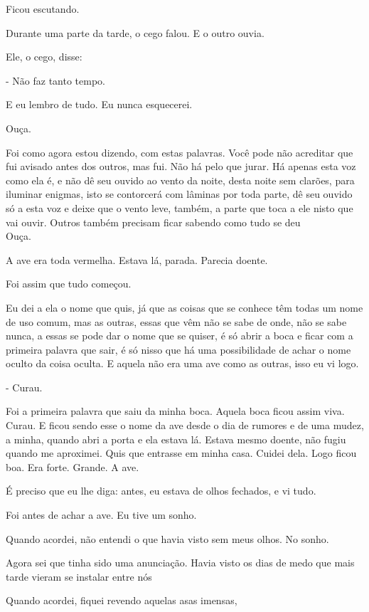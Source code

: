 Ficou escutando.

Durante uma parte da tarde, o cego falou. E o outro ouvia.

Ele, o cego, disse:

- Não faz tanto tempo.

E eu lembro de tudo. Eu nunca esquecerei.

Ouça.

Foi como agora estou dizendo, com estas palavras. Você pode não
acreditar que fui avisado antes dos outros, mas fui. Não há pelo que
jurar. Há apenas esta voz como ela é, e não dê seu ouvido ao vento da
noite, desta noite sem clarões, para iluminar enigmas, isto se
contorcerá com lâminas por toda parte, dê seu ouvido só a esta voz e
deixe que o vento leve, também, a parte que toca a ele nisto que vai
ouvir. Outros também precisam ficar sabendo como tudo se deu\\

Ouça.

A ave era toda vermelha. Estava lá, parada. Parecia doente.

Foi assim que tudo começou.

Eu dei a ela o nome que quis, já que as coisas que se conhece têm todas
um nome de uso comum, mas as outras, essas que vêm não se sabe de onde,
não se sabe nunca, a essas se pode dar o nome que se quiser, é só abrir
a boca e ficar com a primeira palavra que sair, é só nisso que há uma
possibilidade de achar o nome oculto da coisa oculta. E aquela não era
uma ave como as outras, isso eu vi logo.

- Curau.

Foi a primeira palavra que saiu da minha boca. Aquela boca ficou assim
viva. Curau. E ficou sendo esse o nome da ave desde o dia de rumores e
de uma mudez, a minha, quando abri a porta e ela estava lá. Estava mesmo
doente, não fugiu quando me aproximei. Quis que entrasse em minha casa.
Cuidei dela. Logo ficou boa. Era forte. Grande. A ave.

É preciso que eu lhe diga: antes, eu estava de olhos fechados, e vi
tudo.

Foi antes de achar a ave. Eu tive um sonho.

Quando acordei, não entendi o que havia visto sem meus olhos. No sonho.

Agora sei que tinha sido uma anunciação. Havia visto os dias de medo que
mais tarde vieram se instalar entre nós

Quando acordei, fiquei revendo aquelas asas imensas,


